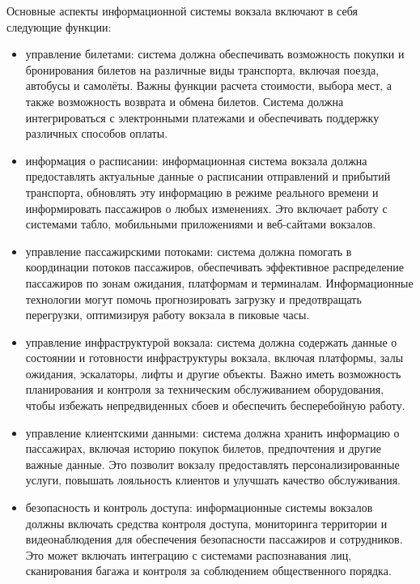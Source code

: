 Основные аспекты информационной системы вокзала включают в себя следующие функции:
\begin{itemize}
    \item управление билетами: система должна обеспечивать возможность покупки и бронирования билетов на различные виды транспорта, включая поезда, автобусы и самолёты. Важны функции расчета стоимости, выбора мест, а также возможность возврата и обмена билетов. Система должна интегрироваться с электронными платежами и обеспечивать поддержку различных способов оплаты.

    \item информация о расписании: информационная система вокзала должна предоставлять актуальные данные о расписании отправлений и прибытий транспорта, обновлять эту информацию в режиме реального времени и информировать пассажиров о любых изменениях. Это включает работу с системами табло, мобильными приложениями и веб-сайтами вокзалов.

    \item управление пассажирскими потоками: система должна помогать в координации потоков пассажиров, обеспечивать эффективное распределение пассажиров по зонам ожидания, платформам и терминалам. Информационные технологии могут помочь прогнозировать загрузку и предотвращать перегрузки, оптимизируя работу вокзала в пиковые часы.

    \item управление инфраструктурой вокзала: система должна содержать данные о состоянии и готовности инфраструктуры вокзала, включая платформы, залы ожидания, эскалаторы, лифты и другие объекты. Важно иметь возможность планирования и контроля за техническим обслуживанием оборудования, чтобы избежать непредвиденных сбоев и обеспечить бесперебойную работу.

    \item управление клиентскими данными: система должна хранить информацию о пассажирах, включая историю покупок билетов, предпочтения и другие важные данные. Это позволит вокзалу предоставлять персонализированные услуги, повышать лояльность клиентов и улучшать качество обслуживания.

    \item безопасность и контроль доступа: информационные системы вокзалов должны включать средства контроля доступа, мониторинга территории и видеонаблюдения для обеспечения безопасности пассажиров и сотрудников. Это может включать интеграцию с системами распознавания лиц, сканирования багажа и контроля за соблюдением общественного порядка.


\end{itemize}
